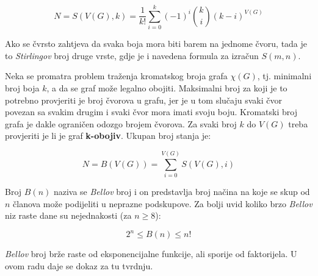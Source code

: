 \documentclass[times, utf8, diplomski, numeric]{fer}
\begin{document}
\begin{equation}
N = S(V(G), k) = \frac{1}{k!}\sum_{i=0}^{k} (-1)^i \binom{k}{i}(k-i)^{V(G)}  
\end{equation}

Ako se čvrsto zahtjeva da svaka boja mora biti barem na jednome čvoru, tada je to \emph{Stirlingov} broj druge vrste, gdje je i navedena formula za izračun $S(m,n)$.

Neka se promatra problem traženja kromatskog broja grafa $\chi(G)$, tj. minimalni broj boja $k$, a da se graf može legalno obojiti. Maksimalni broj za koji je to potrebno provjeriti je broj čvorova u grafu, jer je u tom slučaju svaki čvor povezan sa svakim drugim i svaki čvor mora imati svoju boju. Kromatski broj grafa je dakle ograničen odozgo brojem čvorova. Za svaki broj $k$ do $V(G)$ treba provjeriti je li je graf \textbf{k-obojiv}. Ukupan broj stanja je:

\begin{equation}
N = B(V(G)) = \sum_{i=0}^{V(G)} S(V(G), i)
\end{equation}

Broj $B(n)$ naziva se \emph{Bellov} broj i on predstavlja broj načina na koje se skup od $n$ članova može podijeliti u neprazne podskupove. Za bolji uvid koliko brzo \emph{Bellov} niz raste dane su nejednakosti (za $n\ge 8$): 

\begin{equation}
2^n \le B(n) \le n! 
\end{equation}

\emph{Bellov} broj brže raste od eksponencijalne funkcije, ali sporije od faktorijela. U ovom radu daje se dokaz za tu tvrdnju.
\end{document}
